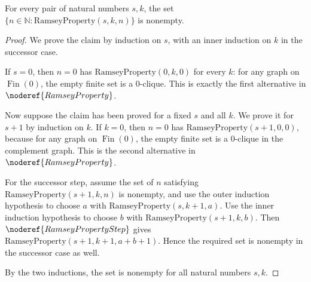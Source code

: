\begin{helper}
For every pair of natural numbers \(s,k\), the set
\(\{n\in\mathbb{N}:\mathrm{RamseyProperty}(s,k,n)\}\) is nonempty.
\end{helper}
\begin{proof}
We prove the claim by induction on \(s\), with an inner induction on \(k\) in
the successor case.

If \(s=0\), then \(n=0\) has \(\mathrm{RamseyProperty}(0,k,0)\) for every
\(k\): for any graph on \(\operatorname{Fin}(0)\), the empty finite set is a
\(0\)-clique.  This is exactly the first alternative in
\(\noderef{RamseyProperty}\).

Now suppose the claim has been proved for a fixed \(s\) and all \(k\).  We
prove it for \(s+1\) by induction on \(k\).  If \(k=0\), then \(n=0\) has
\(\mathrm{RamseyProperty}(s+1,0,0)\), because for any graph on
\(\operatorname{Fin}(0)\), the empty finite set is a \(0\)-clique in the
complement graph.  This is the second alternative in
\(\noderef{RamseyProperty}\).

For the successor step, assume the set of \(n\) satisfying
\(\mathrm{RamseyProperty}(s+1,k,n)\) is nonempty, and use the outer induction
hypothesis to choose \(a\) with \(\mathrm{RamseyProperty}(s,k+1,a)\).  Use the
inner induction hypothesis to choose \(b\) with
\(\mathrm{RamseyProperty}(s+1,k,b)\).  Then
\(\noderef{RamseyPropertyStep}\) gives
\(\mathrm{RamseyProperty}(s+1,k+1,a+b+1)\).  Hence the required set is
nonempty in the successor case as well.

By the two inductions, the set is nonempty for all natural numbers \(s,k\).
\end{proof}
